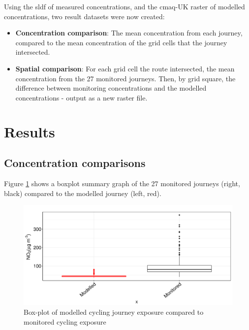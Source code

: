 Using the \gls{sldf} of measured concentrations, and the \gls{cmaq}-UK raster of modelled concentrations, two result datasets were now created:
\begin{itemize}
    \item \textbf{Concentration comparison}: The mean concentration from each journey, compared to the mean concentration of the grid cells that the journey intersected.
    \item \textbf{Spatial comparison}: For each grid cell the route intersected, the mean concentration from the 27 monitored journeys. Then, by grid square, the difference between monitoring concentrations and the modelled concentrations - output as a new raster file.
\end{itemize}

\section{Results}
\label{sec:4results}

\subsection{Concentration comparisons}
\label{subsec:concentrationcomparisons}

Figure \ref{fig:grouped_journey_boxplots} shows a boxplot summary graph of the 27 monitored journeys (right, black) compared to the modelled journey (left, red).

\begin{figure}[H]
\centering
\includegraphics[scale=0.5]{images/grouped_journey_boxplots.png}
\caption{Box-plot of modelled cycling journey exposure compared to monitored cycling exposure}
\label{fig:grouped_journey_boxplots}
\end{figure}

